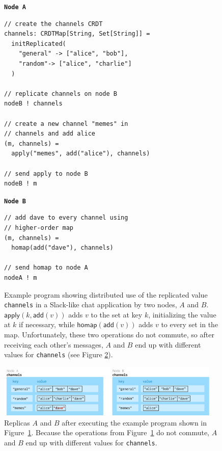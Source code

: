 \documentclass[acmsmall,nonacm]{acmart}
\newcommand{\msf}[1]{\ensuremath{\mathsf{#1}}}
\theoremstyle{plain}
\theoremstyle{definition}
\begin{document}
\begin{figure}[!htb]
    \centering
    \begin{minipage}{.5\textwidth}
        \centering
        \textbf{\texttt{Node A}}
\begin{lstlisting}
// create the channels CRDT 
channels: CRDTMap[String, Set[String]] = 
  initReplicated(
    "general" -> ["alice", "bob"], 
    "random"-> ["alice", "charlie"]
  )

// replicate channels on node B
nodeB ! channels

// create a new channel "memes" in 
// channels and add alice
(m, channels) = 
  apply("memes", add("alice"), channels)

// send apply to node B
nodeB ! m
\end{lstlisting}
    \end{minipage}%
    \begin{minipage}{0.5\textwidth}
        \centering
        \textbf{\texttt{Node B}}
        \scriptsize
\begin{lstlisting}
// add dave to every channel using 
// higher-order map
(m, channels) = 
  homap(add("dave"), channels)

// send homap to node A
nodeA ! m
\end{lstlisting}
        \normalsize        
        \hfill
    \end{minipage}
    
\caption{Example program showing distributed use of the replicated value \texttt{channels} in a Slack-like chat application by two nodes, $A$ and $B$.  $\msf{apply}(k, \msf{add}(v))$ adds $v$ to the set at key $k$, initializing the value at $k$ if necessary, while $\msf{homap}(\msf{add}(v))$ adds $v$ to every set in the map.  Unfortunately, these two operations do not commute, so after receiving each other's messages, $A$ and $B$ end up with different values for \texttt{channels} (see Figure \ref{fig:dictionaries}).}
\label{fig:pseudo}
\end{figure}

\begin{figure}[!htb]
\centering
\includegraphics[width=0.95\textwidth]{nodea-nodeb-dictionaries.pdf}
\caption{Replicas $A$ and $B$ after executing the example program shown in Figure~\ref{fig:pseudo}. Because the operations from Figure~\ref{fig:pseudo} do not commute, $A$ and $B$ end up with different values for \texttt{channels}.}
\label{fig:dictionaries}
\end{figure}
\end{document}

